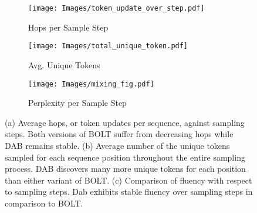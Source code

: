 \begin{figure}
    \centering
    \begin{subfigure}[t]{0.3\textwidth}
        \texttt{[image: Images/token\_update\_over\_step.pdf]}
        \caption{Hops per Sample Step}
    \end{subfigure}
    \begin{subfigure}[t]{0.3\textwidth}
        \texttt{[image: Images/total\_unique\_token.pdf]}
        \caption{Avg. Unique Tokens}
    \end{subfigure}
        \begin{subfigure}[t]{0.3\textwidth}
        \texttt{[image: Images/mixing\_fig.pdf]}
        \caption{Perplexity per Sample Step}
    \end{subfigure}
    \caption{(a) Average hops, or token updates per sequence, against sampling steps. Both versions of BOLT suffer from decreasing hops while DAB remains stable.
    (b) Average number of the unique tokens sampled for each sequence position throughout the entire sampling process. DAB discovers many more unique tokens for each position than either variant of BOLT. 
    (c) Comparison of fluency with respect to sampling steps. Dab exhibits stable fluency over sampling steps in comparison to BOLT. 
    }
    \label{fig:samplespace_explore}
\end{figure}